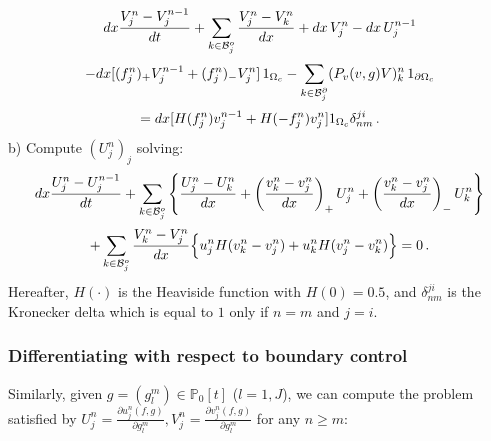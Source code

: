 \documentclass[11pt]{article}
\def \hueco{\noalign{\medskip}}
\def \beq{\begin{equation}}
\def \eeq{\end{equation}}
\def \ba{\begin{array}}
\def \ea{\end{array}}
\def \dis{\displaystyle}
\numberwithin{theorem}{section}
\begin{document}

\beq\label{eq:scheme_Vf}
\ba{c}\dis
dx\frac{V_j^n-V_j^{n-1}}{dt}
+\sum_{k\in {\cal B}_j^o }\frac{V_{j}^n-V_k^{n}}{dx}
+ dx \,V_j^n    - dx \, U_j^{n-1} 
\\ \hueco\dis
    - dx[(f^n_j)_+V^{n-1}_j+(f_j^n)_-V^n_j]\, 1_{\Omega_c}
     - \sum_{k\in {\cal B}_j^\partial }(P_v(v,g) V)^n_k \, 1_{\partial\Omega_c}
\\ \hueco\dis
= dx [ H(f^n_j)v_j^{n-1}+H(-f_j^n)v_j^n ] 
 1_{\Omega_c} \delta_{nm}^{ji}\,.
\ea
\eeq
b) Compute $(U_j^n)_j$ solving:
\beq
\ba{c}\dis\label{eq:scheme_Uf}
dx\frac{U_j^n-U_j^{n-1}}{dt}
+\sum_{k\in {\cal B}_j^o }\left\{\frac{U_{j}^n-U_k^{n}}{dx}
+\left(\frac{v_{k}^n-v_j^{n}}{dx}\right)_+U_j^n  +\left(\frac{v_{k}^n-v_j^{n}}{dx}\right)_-U_{k}^n \right\}
\\ \hueco\dis
+\sum_{k\in {\cal B}_j^o }\frac{V_{k}^n-V_j^{n}}{dx} \Big\{
 u_j^n  H(v_{k}^n-v_j^{n}) 
 +u_{k}^n H(v_{j}^n-v_k^{n}) \Big\}
 =0\,.
\ea
\eeq
Hereafter, $H(\cdot)$ is the Heaviside function with $H(0)=0.5$, and $\delta_{nm}^{ji}$ is the Kronecker delta which is equal to $1$ only if $n=m$ and $j=i$.



\subsubsection{Differentiating with respect to boundary control}

Similarly, given  $g=(g_l^m)\in\mathbb{P}_0[t]$ ($l=1,J$), we can compute the problem satisfied by  $\displaystyle  U^n_j=\frac{\partial u^n_j(f,g)}{\partial g^m_l}, V^n_j=\frac{\partial v^n_j(f,g)}{\partial g^m_l}$ for any $n\ge m$:
\end{document}
